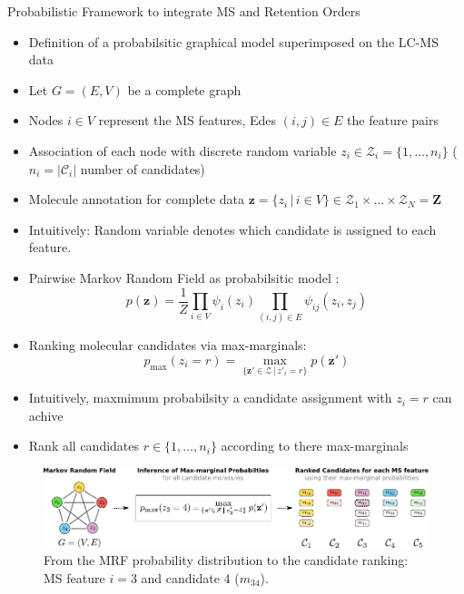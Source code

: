\documentclass{beamer}
\newcommand{\ms}{MS}
\newcommand{\lc}{LC}
\newcommand{\lcms}{\lc-\ms}
\newcommand{\cands}{\mathcal{C}}
\newcommand{\seqlength}{N}
\begin{document}
\begin{frame}{}
\begin{columns}[T]


    \begin{block}{{\normalsize Probabilistic Framework to integrate \ms{} and Retention Orders}}
    \begin{itemize}
        \item Definition of a probabilsitic graphical model superimposed on the \lcms{} data
        \item Let $G=(E,V)$ be a complete graph
        \item Nodes $i\in V$ represent the \ms{} features, Edes $(i,j)\in E$ the feature pairs
        \item Association of each node with discrete random variable $z_i\in\mathcal{Z}_i=\{1,\ldots,n_i\}$ ($n_i=|\cands_i|$ number of candidates)
        \item Molecule annotation for complete data $\mathbf{z}=\{z_i\,|\,i\in V\}\in\mathcal{Z}_1\times\ldots\times\mathcal{Z}_\seqlength=\mathbf{Z}$
        \item Intuitively: Random variable denotes which candidate is assigned to each feature.
        \item Pairwise Markov Random Field as probabilsitic model \cite{MacKay2005}:
            \begin{equation}
                p(\mathbf{z})=\frac{1}{Z}\prod_{i\in V}\psi_i(z_i)\prod_{(i,j)\in E}\psi_{ij}(z_i,z_j)
            \end{equation}
        \item Ranking molecular candidates via max-marginals:
            \begin{equation}
                p_{\max}(z_i=r)=\underset{\{\mathbf{z}'\in\mathcal{Z}\,|\,z'_i=r\}}{\max}p(\mathbf{z}')
            \end{equation}
        \item Intuitively, maxmimum probabilsity a candidate assignment with $z_i=r$ can achive
        \item Rank all candidates $r\in\{1,\ldots,n_i\}$ according to there max-marginals
    \end{itemize}
    \begin{figure}
        \centering
        \includegraphics[width=\textwidth]{images/mrf_and_ranking.pdf}
        \caption{From the MRF probability distribution to the candidate ranking: \ms{} feature $i=3$ and candidate $4$ ($m_{34}$).}
    \end{figure}
    \end{block}


\end{columns}
\end{frame}
\end{document}
